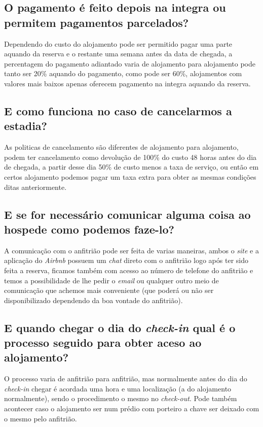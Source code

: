 \documentclass[a4paper]{article}
\begin{document}
\subsection{O pagamento é feito depois na integra ou permitem pagamentos parcelados?}
Dependendo do custo do alojamento pode ser permitido pagar uma parte aquando da reserva e o restante uma semana antes da data de chegada, a percentagem do pagamento adiantado varia de alojamento para alojamento pode tanto ser 20\% aquando do pagamento, como pode ser 60\%, alojamentos com valores mais baixos apenas oferecem pagamento na integra aquando da reserva.

\subsection{E como funciona no caso de cancelarmos a estadia?}
As politicas de cancelamento são diferentes de alojamento para alojamento, podem ter cancelamento como devolução de 100\% do custo 48 horas antes do dia de chegada, a partir desse dia 50\% de custo menos a taxa de serviço, ou então em certos alojamento podemos pagar um taxa extra para obter as mesmas condições ditas anteriormente.

\subsection{E se for necessário comunicar alguma coisa ao hospede como podemos faze-lo?}
A comunicação com o anfitrião pode ser feita de varias maneiras, ambos o \textit{site} e a aplicação do \textit{Airbnb} possuem um \textit{chat} direto com o anfitrião logo após ter sido feita a reserva, ficamos também com acesso ao número de telefone do anfitrião e temos a possibilidade de lhe pedir o \textit{email} ou qualquer outro meio de comunicação que achemos mais conveniente (que poderá ou não ser disponibilizado dependendo da boa vontade do anfitrião).

\subsection{E quando chegar o dia do \textit{check-in} qual é o processo seguido para obter aceso ao alojamento?}
O processo varia de anfitrião para anfitrião, mas normalmente antes do dia do \textit{check-in} chegar é acordada uma hora e uma localização (a do alojamento normalmente), sendo o procedimento o mesmo no \textit{check-out}.
Pode também acontecer caso o alojamento ser num prédio com porteiro a chave ser deixado com o mesmo pelo anfitrião.
\end{document}
